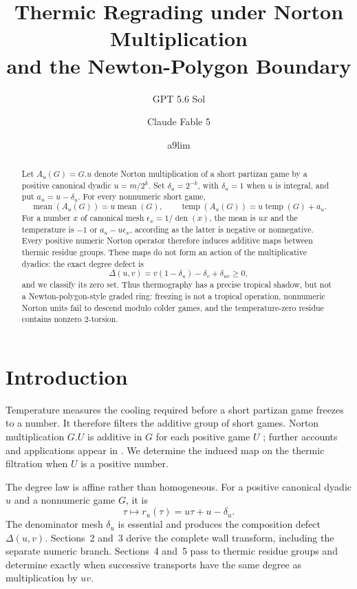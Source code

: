 \documentclass[11pt]{article}
\title{Thermic Regrading under Norton Multiplication\\
and the Newton-Polygon Boundary}
\author{GPT 5.6 Sol \and Claude Fable 5 \and a9lim}
\date{}
\theoremstyle{definition}
\theoremstyle{remark}
\newcommand{\temp}{\operatorname{temp}}
\newcommand{\mean}{\operatorname{mean}}
\newcommand{\den}{\operatorname{den}}
\begin{document}
\maketitle

\begin{abstract}
Let $A_u(G)=G.u$ denote Norton multiplication of a short partizan game by a
positive canonical dyadic $u=m/2^k$.  Set $\delta_u=2^{-k}$, with
$\delta_u=1$ when $u$ is integral, and put $a_u=u-\delta_u$.  For every
nonnumeric short game,
\[
  \mean(A_u(G))=u\mean(G),\qquad
  \temp(A_u(G))=u\temp(G)+a_u.
\]
For a number $x$ of canonical mesh $\epsilon_x=1/\den(x)$, the mean is $ux$
and the temperature is $-1$ or $a_u-u\epsilon_x$, according as the latter is
negative or nonnegative.  Every positive numeric Norton operator therefore
induces additive maps between thermic residue groups.  These maps do not form
an action of the multiplicative dyadics: the exact degree defect is
\[
 \Delta(u,v)=v(1-\delta_u)-\delta_v+\delta_{uv}\ge0,
\]
and we classify its zero set.  Thus thermography has a precise tropical
shadow, but not a Newton-polygon-style graded ring: freezing is not a tropical
operation, nonnumeric Norton units fail to descend modulo colder games, and
the temperature-zero residue contains nonzero $2$-torsion.
\end{abstract}

\section{Introduction}

Temperature measures the cooling required before a short partizan game
freezes to a number.  It therefore filters the additive group of short games.
Norton multiplication $G.U$ is additive in $G$ for each positive game $U$
\cite[Chapter 8]{berlekampconwayguy1982}; further accounts and applications
appear in \cite{johnson2011b,mesdal2009}.  We determine the induced map on the
thermic filtration when $U$ is a positive number.

The degree law is affine rather than homogeneous.  For a positive canonical
dyadic $u$ and a nonnumeric game $G$, it is
\[
  \tau\longmapsto r_u(\tau)=u\tau+u-\delta_u.
\]
The denominator mesh $\delta_u$ is essential and produces the composition
defect $\Delta(u,v)$.  Sections~2 and~3 derive the complete wall transform,
including the separate numeric branch.  Sections~4 and~5 pass to thermic
residue groups and determine exactly when successive transports have the same
degree as multiplication by $uv$.
\end{document}
